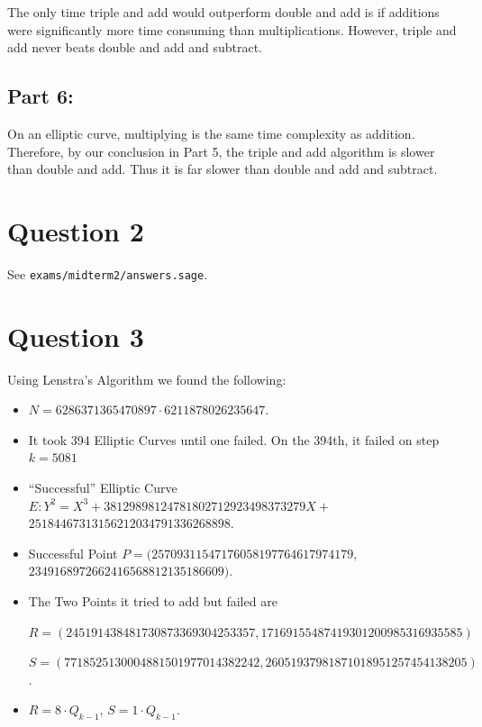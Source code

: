 \documentclass[12pt,letterpaper]{article}
\begin{document}
    The only time triple and add would outperform double and add is if additions were significantly more time consuming than multiplications. However, triple and add never beats double and add and subtract.

\subsection*{Part 6:}
    
    On an elliptic curve, multiplying is the same time complexity as addition. Therefore, by our conclusion in Part 5, the triple and add algorithm is slower than double and add. Thus it is far slower than double and add and subtract.
    
\section*{Question 2}

    See \texttt{exams/midterm2/answers.sage}.

\section*{Question 3}
    Using Lenstra's Algorithm we found the following:
    \begin{itemize}
        \item $N = 6286371365470897\cdot6211878026235647$.
        
        \item It took 394 Elliptic Curves until one failed. On the 394th, it failed on step $k = 5081$
        
        \item ``Successful'' Elliptic Curve $E : Y^2 = X^3 + 38129898124781802712923498373279 X +$  \\$25184467313156212034791336268898$.
        
        \item Successful Point $P = (25709311547176058197764617974179,$\\ $2349168972662416568812135186609)$.
        
        \item The Two Points it tried to add but failed are
        
        $R = (245191438481730873369304253357, 17169155487419301200985316935585)$
        
        $S = (7718525130004881501977014382242, 26051937981871018951257454138205)$.
        
        \item $R = 8\cdot Q_{k-1}$, $S = 1\cdot Q_{k-1}$.
    \end{itemize}
    
\end{document}
